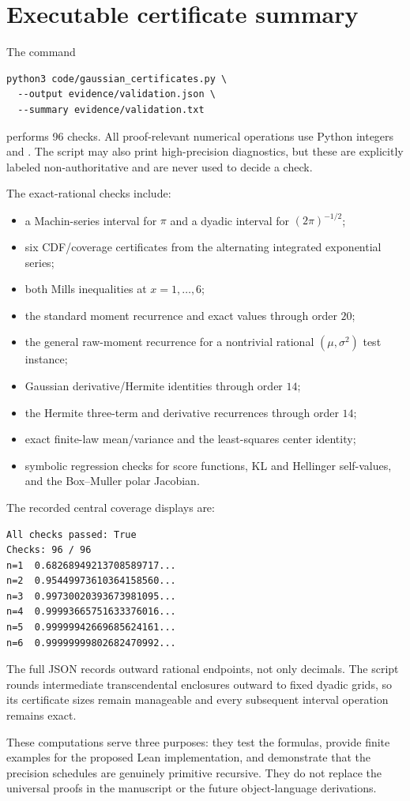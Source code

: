 \section{Executable certificate summary}\label{app:certificates}

The command
\begin{lstlisting}
python3 code/gaussian_certificates.py \
  --output evidence/validation.json \
  --summary evidence/validation.txt
\end{lstlisting}
performs 96 checks.  All proof-relevant numerical operations use Python integers and .  The script may also print high-precision  diagnostics, but these are explicitly labeled non-authoritative and are never used to decide a check.

The exact-rational checks include:
\begin{itemize}
  \item a Machin-series interval for $\pi$ and a dyadic interval for $(2\pi)^{-1/2}$;
  \item six CDF/coverage certificates from the alternating integrated exponential series;
  \item both Mills inequalities at $x=1,\dots,6$;
  \item the standard moment recurrence and exact values through order $20$;
  \item the general raw-moment recurrence for a nontrivial rational $(\mu,\sigma^2)$ test instance;
  \item Gaussian derivative/Hermite identities through order $14$;
  \item the Hermite three-term and derivative recurrences through order $14$;
  \item exact finite-law mean/variance and the least-squares center identity;
  \item symbolic regression checks for score functions, KL and Hellinger self-values, and the Box--Muller polar Jacobian.
\end{itemize}

The recorded central coverage displays are:
\begin{lstlisting}
All checks passed: True
Checks: 96 / 96
n=1  0.68268949213708589717...
n=2  0.95449973610364158560...
n=3  0.99730020393673981095...
n=4  0.99993665751633376016...
n=5  0.99999942669685624161...
n=6  0.99999999802682470992...
\end{lstlisting}
The full JSON records outward rational endpoints, not only decimals.  The script rounds intermediate transcendental enclosures outward to fixed dyadic grids, so its certificate sizes remain manageable and every subsequent interval operation remains exact.

These computations serve three purposes: they test the formulas, provide finite examples for the proposed Lean implementation, and demonstrate that the precision schedules are genuinely primitive recursive.  They do not replace the universal proofs in the manuscript or the future object-language derivations.
